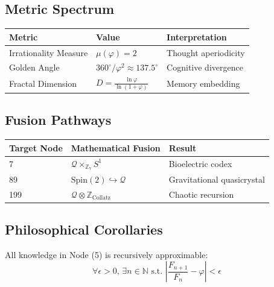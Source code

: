 \documentclass[12pt]{article}
\begin{document}
\subsection{Metric Spectrum}

\begin{table}[h]
\centering
\begin{tabular}{|l|l|l|}
\hline
\textbf{Metric} & \textbf{Value} & \textbf{Interpretation} \\ \hline
Irrationality Measure & \( \mu(\varphi) = 2 \) & Thought aperiodicity \\ \hline
Golden Angle & \( 360^\circ/\varphi^2 \approx 137.5^\circ \) & Cognitive divergence \\ \hline
Fractal Dimension & \( D = \frac{\ln \varphi}{\ln(1+\varphi)} \) & Memory embedding \\ \hline
\end{tabular}
\end{table}

\subsection{Fusion Pathways}

\begin{table}[h]
\centering
\begin{tabular}{|l|l|l|}
\hline
\textbf{Target Node} & \textbf{Mathematical Fusion} & \textbf{Result} \\ \hline
7 & \( \mathcal{Q} \times_{\mathbb{Z}_7} S^1 \) & Bioelectric codex \\ \hline
89 & \( \text{Spin}(2) \hookrightarrow \mathcal{Q} \) & Gravitational quasicrystal \\ \hline
199 & \( \mathcal{Q} \otimes \mathbb{Z}_\text{Collatz} \) & Chaotic recursion \\ \hline
\end{tabular}
\end{table}

\subsection{Philosophical Corollaries}

\begin{theorem}
All knowledge in Node (5) is recursively approximable:
\[
\forall \epsilon > 0, \, \exists n \in \mathbb{N} \text{ s.t. } \left| \frac{F_{n+1}}{F_n} - \varphi \right| < \epsilon
\]
\end{theorem}
\end{document}
